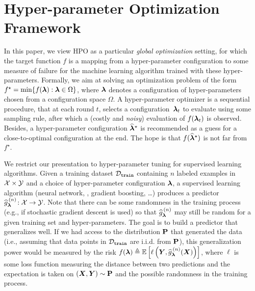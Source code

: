 \section{Hyper-parameter Optimization Framework}\label{sec:dttts.framework}

In this paper, we view HPO as a particular \emph{global optimization} setting, for which the target function $f$ is a mapping from a hyper-parameter configuration to some measure of failure for the machine learning algorithm trained with these hyper-parameters. Formally, we aim at solving an optimization problem of the form $f^\star = \min \{f({\boldsymbol \lambda}):{\boldsymbol \lambda}\in\Omega\}$, where ${\boldsymbol \lambda}$ denotes a configuration of hyper-parameters chosen from a configuration space $\Omega$. A hyper-parameter optimizer is a sequential procedure, that at each round $t$, selects a configuration~${\boldsymbol \lambda}_t$ to evaluate using some sampling rule, after which a (costly and \emph{noisy}) evaluation of $f({\boldsymbol \lambda}_t)$ is observed. Besides, a hyper-parameter configuration $\widehat{{\boldsymbol \lambda}}^\star$ is recommended as a guess for a close-to-optimal configuration at the end. The hope is that $f(\widehat{{\boldsymbol \lambda}}^\star)$ is not far from $f^\star$.

We restrict our presentation to hyper-parameter tuning for supervised learning algorithms. Given a training dataset $\mathcal{D}_{\texttt{train}}$ containing $n$ labeled examples in $\mathcal{X} \times \mathcal{Y}$ and a choice of hyper-parameter configuration ${\boldsymbol \lambda}$, a supervised learning algorithm (neural network, \SVM, gradient boosting, \dots) produces a predictor $\widehat{g}_{\bm\lambda}^{\,(n)}\!:\mathcal{X} \rightarrow \mathcal{Y}$. Note that there can be some randomness in the training process (e.g., if stochastic gradient descent is used) so that $\widehat{g}_{{\boldsymbol \lambda}}^{\,(n)}$ may still be random for a given training set and hyper-parameters. The goal is to build a predictor that generalizes well. If we had access to the distribution ${\bf P}$ that generated the data (i.e., assuming that data points in $\mathcal{D}_{\texttt{train}}$ are i.i.d. from ${\bf P}$), this generalization power would be measured by the risk $f(\bm\lambda) \triangleq \mathbb{E}\left[\ell\left(\bm Y,\widehat g_{{\boldsymbol \lambda}}^{\,(n)}(\bm X)\right) \right]$, where $\ell$ is some loss function measuring the distance between two predictions and the expectation is taken on $(\bm X , \bm Y) \sim {\bf P}$ and the possible randomness in the training process. 


